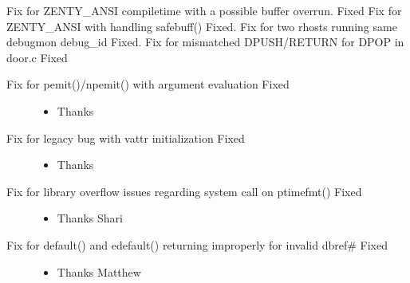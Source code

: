 \documentclass[letterpaper,10pt,english]{sphinxmanual}
\begin{document}
\sphinxAtStartPar
Fix for ZENTY\_ANSI compiletime with a possible buffer overrun. \sphinxhyphen{} Fixed
Fix for ZENTY\_ANSI with handling safebuff() \sphinxhyphen{} Fixed.
Fix for two rhosts running same debugmon debug\_id \sphinxhyphen{} Fixed.
Fix for mis\sphinxhyphen{}matched DPUSH/RETURN for DPOP in door.c \sphinxhyphen{} Fixed
\begin{description}
\item[{Fix for pemit()/npemit() with argument evaluation \sphinxhyphen{} Fixed}] \leavevmode\begin{itemize}
\item {} 
\sphinxAtStartPar
Thanks 

\end{itemize}

\item[{Fix for legacy bug with vattr initialization \sphinxhyphen{} Fixed}] \leavevmode\begin{itemize}
\item {} 
\sphinxAtStartPar
Thanks 

\end{itemize}

\item[{Fix for library overflow issues regarding system call on ptimefmt() \sphinxhyphen{} Fixed}] \leavevmode\begin{itemize}
\item {} 
\sphinxAtStartPar
Thanks Shari

\end{itemize}

\item[{Fix for default() and edefault() returning improperly for invalid dbref\# \sphinxhyphen{} Fixed}] \leavevmode\begin{itemize}
\item {} 
\sphinxAtStartPar
Thanks Matthew

\end{itemize}

\end{description}
\end{document}
